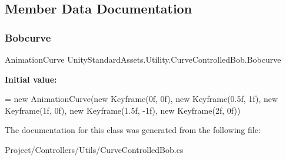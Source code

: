 \subsection{Member Data Documentation}
\mbox{\label{class_unity_standard_assets_1_1_utility_1_1_curve_controlled_bob_a11a0684cea298938d69397023f88b0ae}} 
\subsubsection{\texorpdfstring{Bobcurve}{Bobcurve}}
{\footnotesize\ttfamily Animation\+Curve Unity\+Standard\+Assets.\+Utility.\+Curve\+Controlled\+Bob.\+Bobcurve}

{\bfseries Initial value\+:}
\begin{DoxyCode}
= \textcolor{keyword}{new} AnimationCurve(\textcolor{keyword}{new} Keyframe(0f, 0f), \textcolor{keyword}{new} Keyframe(0.5f, 1f),
                                                            \textcolor{keyword}{new} Keyframe(1f, 0f), \textcolor{keyword}{new} Keyframe(1.5f, -1f),
                                                            \textcolor{keyword}{new} Keyframe(2f, 0f))
\end{DoxyCode}


The documentation for this class was generated from the following file\+:\begin{DoxyCompactItemize}
\item 
Project/\+Controllers/\+Utils/Curve\+Controlled\+Bob.\+cs\end{DoxyCompactItemize}
